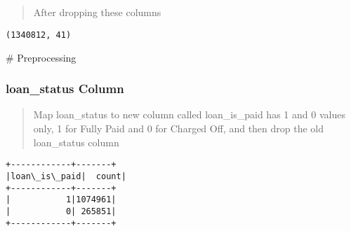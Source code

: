 \documentclass[11pt]{article}
\begin{document}
    \begin{center}
    \end{center}
    { \hspace*{\fill} \\}
    
    \begin{center}
    \end{center}
    { \hspace*{\fill} \\}
    
    \begin{center}
    \end{center}
    { \hspace*{\fill} \\}
    
    \begin{center}
    \end{center}
    { \hspace*{\fill} \\}
    
    \begin{quote}
After dropping these columns
\end{quote}

    \begin{Verbatim}[commandchars=\\\{\}]
(1340812, 41)
    \end{Verbatim}

    \# Preprocessing

    \hypertarget{loan_status-column}{%
\subsubsection{loan\_status Column}\label{loan_status-column}}

    \begin{quote}
Map loan\_status to new column called loan\_is\_paid has 1 and 0 values
only, 1 for Fully Paid and 0 for Charged Off, and then drop the old
loan\_status column
\end{quote}

    \begin{Verbatim}[commandchars=\\\{\}]
+------------+-------+
|loan\_is\_paid|  count|
+------------+-------+
|           1|1074961|
|           0| 265851|
+------------+-------+

    \end{Verbatim}
\end{document}
